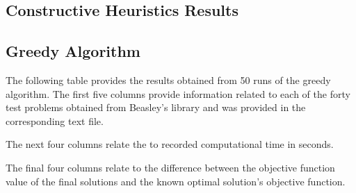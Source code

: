 \documentclass[11pt]{article}
\newcommand{\np}{\newpage}
\begin{document}
	\np
	\begin{appendices}
		\section{Constructive Heuristics Results}
		\subsection{Greedy Algorithm}
		
		The following table provides the results obtained from 50 runs of the greedy algorithm.  The first five columns provide information related to each of the forty test problems obtained from Beasley's library \cite{BEAS90} and was provided in the corresponding text file.
		
		The next four columns relate the to recorded computational time in seconds.
		
		The final four columns relate to the difference between the objective function value of the final solutions and the known optimal solution's objective function.
		

\end{appendices}
\end{document}
